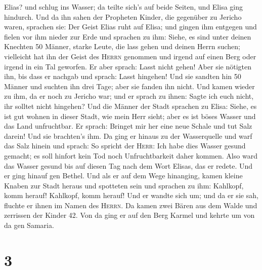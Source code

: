 Elias? und schlug ins Wasser; da teilte sich's auf beide Seiten, und
Elisa ging hindurch.  Und da ihn sahen der Propheten
Kinder, die gegenüber zu Jericho waren, sprachen sie: Der Geist Elias
ruht auf Elisa; und gingen ihm entgegen und fielen vor ihm nieder zur
Erde  und sprachen zu ihm: Siehe, es sind unter deinen
Knechten 50 Männer, starke Leute, die lass gehen und deinen Herrn
suchen; vielleicht hat ihn der Geist des \textsc{Herrn} genommen und
irgend auf einen Berg oder irgend in ein Tal geworfen. Er aber sprach:
Lasst nicht gehen!  Aber sie nötigten ihn, bis dass er
nachgab und sprach: Lasst hingehen! Und sie sandten hin 50 Männer und
suchten ihn drei Tage; aber sie fanden ihn nicht.  Und
kamen wieder zu ihm, da er noch zu Jericho war; und er sprach zu ihnen:
Sagte ich euch nicht, ihr solltet nicht hingehen?  Und
die Männer der Stadt sprachen zu Elisa: Siehe, es ist gut wohnen in
dieser Stadt, wie mein Herr sieht; aber es ist böses Wasser und das Land
unfruchtbar.  Er sprach: Bringet mir her eine neue Schale
und tut Salz darein! Und sie brachten's ihm.  Da ging er
hinaus zu der Wasserquelle und warf das Salz hinein und sprach: So
spricht der \textsc{Herr}: Ich habe dies Wasser gesund gemacht; es soll
hinfort kein Tod noch Unfruchtbarkeit daher kommen.  Also
ward das Wasser gesund bis auf diesen Tag nach dem Wort Elisas, das er
redete.  Und er ging hinauf gen Bethel. Und als er auf
dem Wege hinanging, kamen kleine Knaben zur Stadt heraus und spotteten
sein und sprachen zu ihm: Kahlkopf, komm herauf! Kahlkopf, komm herauf!
 Und er wandte sich um; und da er sie sah, fluchte er
ihnen im Namen des \textsc{Herrn}. Da kamen zwei Bären aus dem Walde und
zerrissen der Kinder 42.  Von da ging er auf den Berg
Karmel und kehrte um von da gen Samaria.

\hypertarget{section-2}{%
\section{3}\label{section-2}}

